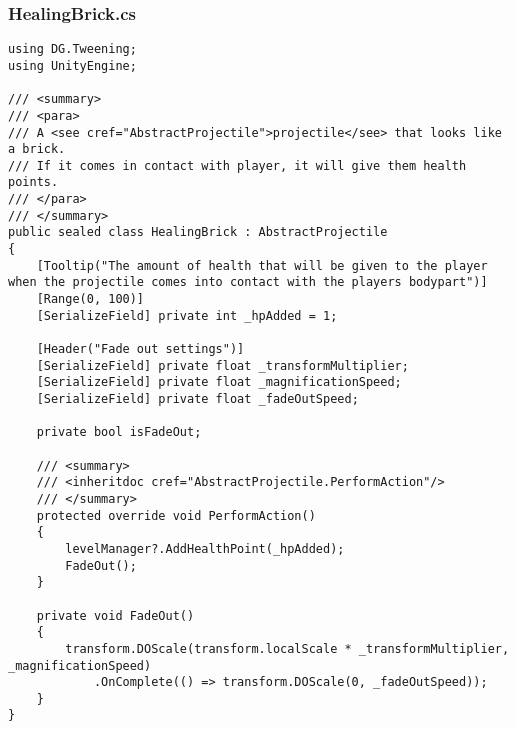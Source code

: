\subsubsection*{HealingBrick.cs}
\begin{verbatim}
using DG.Tweening;
using UnityEngine;

/// <summary>
/// <para>
/// A <see cref="AbstractProjectile">projectile</see> that looks like a brick.
/// If it comes in contact with player, it will give them health points.
/// </para>
/// </summary>
public sealed class HealingBrick : AbstractProjectile
{
    [Tooltip("The amount of health that will be given to the player when the projectile comes into contact with the players bodypart")]
    [Range(0, 100)]
    [SerializeField] private int _hpAdded = 1;

    [Header("Fade out settings")]
    [SerializeField] private float _transformMultiplier;
    [SerializeField] private float _magnificationSpeed;
    [SerializeField] private float _fadeOutSpeed;

    private bool isFadeOut;

    /// <summary>
    /// <inheritdoc cref="AbstractProjectile.PerformAction"/>
    /// </summary>
    protected override void PerformAction()
    {
        levelManager?.AddHealthPoint(_hpAdded);
        FadeOut();
    }

    private void FadeOut()
    {
        transform.DOScale(transform.localScale * _transformMultiplier, _magnificationSpeed)
            .OnComplete(() => transform.DOScale(0, _fadeOutSpeed));
    }
}
\end{verbatim}
